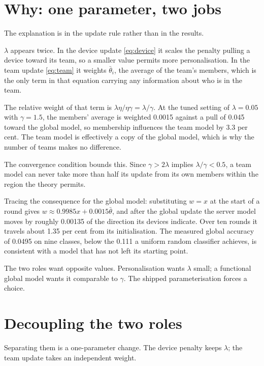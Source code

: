 \section{Why: one parameter, two jobs}
\label{sec:lambda-analysis}

The explanation is in the update rule rather than in the results.

$\lambda$ appears twice. In the device update \eqref{eq:device} it scales the
penalty pulling a device toward its team, so a smaller value permits more
personalisation. In the team update \eqref{eq:team} it weights $\bar{\theta}_i$,
the average of the team's members, which is the only term in that equation
carrying any information about who is in the team.

The relative weight of that term is $\lambda\eta / \eta\gamma = \lambda/\gamma$.
At the tuned setting of $\lambda = 0.05$ with $\gamma = 1.5$, the members'
average is weighted 0.0015 against a pull of 0.045 toward the global model, so
membership influences the team model by 3.3 per cent. The team model is
effectively a copy of the global model, which is why the number of teams makes
no difference.

The convergence condition bounds this. Since $\gamma > 2\lambda$ implies
$\lambda/\gamma < 0.5$, a team model can never take more than half its update
from its own members within the region the theory permits.

Tracing the consequence for the global model: substituting $w = x$ at the start
of a round gives $w \approx 0.9985x + 0.0015\bar{\theta}$, and after the global
update the server model moves by roughly 0.00135 of the direction its devices
indicate. Over ten rounds it travels about 1.35 per cent from its
initialisation. The measured global accuracy of 0.0495 on nine classes, below
the 0.111 a uniform random classifier achieves, is consistent with a model that
has not left its starting point.

The two roles want opposite values. Personalisation wants $\lambda$ small; a
functional global model wants it comparable to $\gamma$. The shipped
parameterisation forces a choice.

\section{Decoupling the two roles}
\label{sec:decoupling}

Separating them is a one-parameter change. The device penalty keeps $\lambda$;
the team update takes an independent weight.

